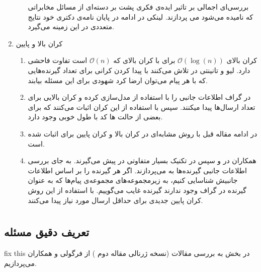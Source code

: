 \begin{enumerate}
\begin{enumerate}
	\cite{7176784}
	بررسی‌ای اجمالی بر تاثیر ایده‌ی فکری پشت
	\picod
	بر دسته‌ای از مسائل مخابراتی که
	نامیده می‌شود می پردازند. لینکی در ادامه در پایان نامه‌ی دکتری خود
	\cite{linqiphd}
	نتایج متعددی در این زمینه می‌گیرد.
		\end{enumerate}
		\item کران بالا و پایین
		\begin{enumerate}
			\item 
			کران بالای
			$\mathcal{O}(\log(n))$
			برای
			\picod
			با کران بالای
			\icod
			که
			$\mathcal{O}(n)$
			است تفاوت فاحشی دارد. لیو و تانینتی در
			\cite{7606849}
		تلاش می‌کنند با پیدا کردن کرانی برای تعداد گیرنده‌هایی که با هر پیام می‌توان ارضا کرد شهودی برای این مسئله بیابند.
			\item 
			در
			\cite{9518120}
			گراف اطلاعات جانبی را با استفاده از 
			مدل‌سازی کرده و کران بالایی برای تعداد ارسال‌ها پیدا میکنند. سپس با استفاده از این کران اثبات می‌کنند که برای بعضی از حالت ها کد با طول خوبی وجود دارد.
			\item
			در ادامه مقاله قبل با روش مشابه‌ای در
			\cite{9965883}
			کران بالا و کران پایین برای
			\picod
			اثبات شده است.
					\item
					همکاران در
			\cite{ong2019improved}
			و سپس در
			\cite{8849527}
			تکنیک بسیار متفاوتی در پیش می‌گیرند. به جای بررسی اطلاعات جانبی گیرنده‌ها به 
		می‌پردازند. اگر هر گیرنده را بر اساس اطلاعات جانبیش شناسایی کنیم، به زیرمجموعه‌های مجموعه‌ی پیام‌ها که به عنوان گیرنده در گراف وجود ندارند گیرنده غایب می‌گوییم. با استفاده از این روش کران پایین جدیدی برای حداقل ارسال مورد نیاز پیدا می‌کنند.
		\end{enumerate}
\end{enumerate}


\section{
\picod
}
\subsection{تعریف دقیق مسئله}
\label{sec:3:3}
fix this
در بخش به بررسی مقالات
\cite{pliablefirstpaper,6620405, pliable2015paper,  song2017polynomialtime}
(نسخه ژرنالی مقاله دوم
\cite{7541273}
) از فرگولی و همکاران می‌پردازیم. 

